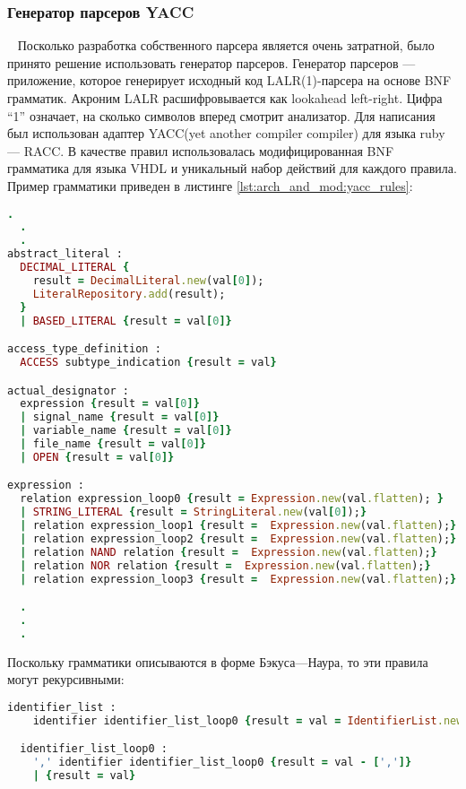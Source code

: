 \subsubsection{Генератор парсеров YACC}~
\label{sub:arch_and_mod:parser_generator}
Посколько разработка собственного парсера является очень затратной, было принято решение использовать генератор парсеров. Генератор парсеров --- приложение, которое генерирует исходный код LALR(1)-парсера на основе BNF грамматик. Акроним LALR расшифровывается как lookahead left-right. Цифра ``1'' означает, на сколько символов вперед смотрит анализатор. Для написания был использован адаптер YACC(yet another compiler compiler) для языка ruby --- RACC. В качестве правил использовалась модифицированная BNF грамматика для языка VHDL и уникальный набор действий для каждого правила. Пример грамматики приведен в листинге \ref{lst:arch_and_mod:yacc_rules}:
\begin{lstlisting}[language=Ruby, style=rubystyle,caption={Различные описания грамматик и действия, вызываемые при соответствии грамматики линейной последовательности}, label=lst:arch_and_mod:yacc_rules]
  .
  .
  .
abstract_literal :
  DECIMAL_LITERAL {
    result = DecimalLiteral.new(val[0]);
    LiteralRepository.add(result);
  }
  | BASED_LITERAL {result = val[0]}

access_type_definition :
  ACCESS subtype_indication {result = val}

actual_designator :
  expression {result = val[0]}
  | signal_name {result = val[0]}
  | variable_name {result = val[0]}
  | file_name {result = val[0]}
  | OPEN {result = val[0]}

expression :
  relation expression_loop0 {result = Expression.new(val.flatten); }
  | STRING_LITERAL {result = StringLiteral.new(val[0]);}
  | relation expression_loop1 {result =  Expression.new(val.flatten);}
  | relation expression_loop2 {result =  Expression.new(val.flatten);}
  | relation NAND relation {result =  Expression.new(val.flatten);}
  | relation NOR relation {result =  Expression.new(val.flatten);}
  | relation expression_loop3 {result =  Expression.new(val.flatten);}

  .
  .
  .
\end{lstlisting}
Поскольку грамматики описываются в форме Бэкуса---Наура, то эти правила могут рекурсивными:


\begin{lstlisting}[language=Ruby, style=rubystyle,caption={Пример рекурсивных правил}, label=lst:arch_and_mod:recursive_rules]
  identifier_list :
    identifier identifier_list_loop0 {result = val = IdentifierList.new(val.flatten); InitializeRepository.add(result.identifiers) }

  identifier_list_loop0 :
    ',' identifier identifier_list_loop0 {result = val - [',']}
    | {result = val}
\end{lstlisting}


